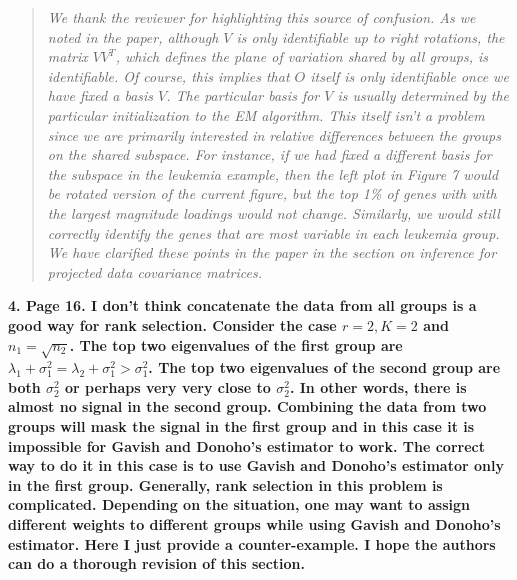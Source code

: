 \documentclass{article}
\newenvironment{resp}{\begin{quotation}\noindent\slshape}{\end{quotation}}
\begin{document}
\begin{resp}
We thank the reviewer for highlighting this source of confusion.  As we noted in the paper, although $V$ is only identifiable up to right rotations, the matrix $VV^T$, which defines
the plane of variation shared by all groups, is identifiable. Of course, this implies that $O$ itself is only identifiable once we have fixed a basis $V$.  The particular basis for $V$ is usually determined by the particular initialization to the EM algorithm. This itself isn't a problem since we are primarily interested in relative differences between the groups on the shared subspace.  For instance, if we had fixed a different basis for the subspace in the leukemia example, then the left plot in Figure 7 would be rotated version of the current figure, but the top 1\% of genes with with the largest magnitude loadings would not change.  Similarly, we would still correctly identify the genes that are most variable in each leukemia group. We have clarified these points in the paper in the section on inference for projected data covariance matrices.
\end{resp}


\noindent \textbf{4. Page 16. I don’t think concatenate the data from all groups is a good way for rank selection. Consider the case $r = 2, K = 2$ and $n_1 =\sqrt{n_2}$. The top two eigenvalues of
the first group are $\lambda_1+\sigma_1^2 = \lambda_2+\sigma_1^2 > \sigma_1^2$.  The top two eigenvalues of the second group are both $\sigma_2^2$  or perhaps very very close to $\sigma_2^2$. In other words, there is almost no signal in the second group. Combining the data from two groups will mask the signal in the first group and in this case it is impossible for Gavish and Donoho’s estimator to work. The correct way to do it in this case is to use Gavish and Donoho’s estimator only in the first group. Generally, rank selection in this problem is complicated. Depending on the situation, one may want to assign different weights to different groups while using Gavish and Donoho’s estimator. Here I just provide a counter-example. I hope the authors can do a thorough revision of this section.}
\end{document}
